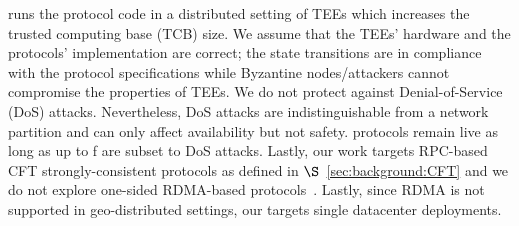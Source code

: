 
 \projecttitle{} runs the protocol code in a distributed setting of TEEs which increases the trusted computing base (TCB) size. We assume that the TEEs' hardware and the protocols' implementation are correct; the state transitions are in compliance with the protocol specifications while Byzantine nodes/attackers cannot compromise the properties of TEEs.  We do not protect against Denial-of-Service (DoS) attacks. Nevertheless, DoS attacks are indistinguishable from a network partition and can only affect availability but not safety. \projecttitle{} protocols remain live as long as up to f are subset to DoS attacks. Lastly, our work targets RPC-based CFT strongly-consistent protocols as defined in $\S$~\ref{sec:background:CFT} and we do not explore one-sided RDMA-based protocols~\cite{10.1145/3545008.3545041, 10.1145/3127479.3128609, 10.1145/2749246.2749267}. Lastly, since RDMA is not supported in geo-distributed settings, our \projecttitle{} targets single datacenter deployments.

\fi





